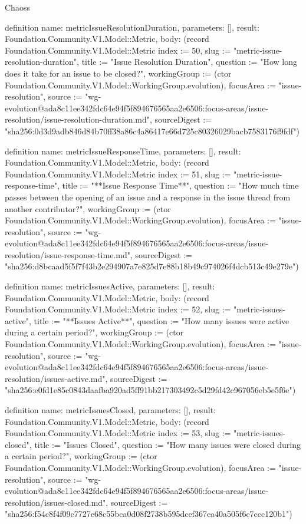 \begin{lexlean}{Chaoss}
\begin{semanticmodule}
definition{
  name: metricIssueResolutionDuration,
  parameters: [],
  result: Foundation.Community.V1.Model::Metric,
  body: (record Foundation.Community.V1.Model::Metric {index := 50, slug := "metric-issue-resolution-duration", title := "Issue Resolution Duration", question := "How long does it take for an issue to be closed?", workingGroup := (ctor Foundation.Community.V1.Model::WorkingGroup.evolution), focusArea := "issue-resolution", source := "wg-evolution@ada8c11ee342fdc64e94f5f894676565aa2e6506:focus-areas/issue-resolution/issue-resolution-duration.md", sourceDigest := "sha256:0d3d9adb846d84b70ff38a86c4a86417e66d725c80326029bacb7583176f9fdf"})
}

definition{
  name: metricIssueResponseTime,
  parameters: [],
  result: Foundation.Community.V1.Model::Metric,
  body: (record Foundation.Community.V1.Model::Metric {index := 51, slug := "metric-issue-response-time", title := "**Issue Response Time**", question := "How much time passes between the opening of an issue and a response in the issue thread from another contributor?", workingGroup := (ctor Foundation.Community.V1.Model::WorkingGroup.evolution), focusArea := "issue-resolution", source := "wg-evolution@ada8c11ee342fdc64e94f5f894676565aa2e6506:focus-areas/issue-resolution/issue-response-time.md", sourceDigest := "sha256:d8bcaad5f5f7f43b2e294907a7e825d7e88b18b49c974026f4dcb513c49e279e"})
}

definition{
  name: metricIssuesActive,
  parameters: [],
  result: Foundation.Community.V1.Model::Metric,
  body: (record Foundation.Community.V1.Model::Metric {index := 52, slug := "metric-issues-active", title := "**Issues Active**", question := "How many issues were active during a certain period?", workingGroup := (ctor Foundation.Community.V1.Model::WorkingGroup.evolution), focusArea := "issue-resolution", source := "wg-evolution@ada8c11ee342fdc64e94f5f894676565aa2e6506:focus-areas/issue-resolution/issues-active.md", sourceDigest := "sha256:e0fd1e85c0843daafba920ad5ff91bb217303492c5d29fd42c967056eb5e5f6e"})
}

definition{
  name: metricIssuesClosed,
  parameters: [],
  result: Foundation.Community.V1.Model::Metric,
  body: (record Foundation.Community.V1.Model::Metric {index := 53, slug := "metric-issues-closed", title := "Issues Closed", question := "How many issues were closed during a certain period?", workingGroup := (ctor Foundation.Community.V1.Model::WorkingGroup.evolution), focusArea := "issue-resolution", source := "wg-evolution@ada8c11ee342fdc64e94f5f894676565aa2e6506:focus-areas/issue-resolution/issues-closed.md", sourceDigest := "sha256:f54c8f4f09c7727e68c55bca0d08f2738b595dcef367ea40a505f6c7ccc120b1"})
}


\end{semanticmodule}
\end{lexlean}
